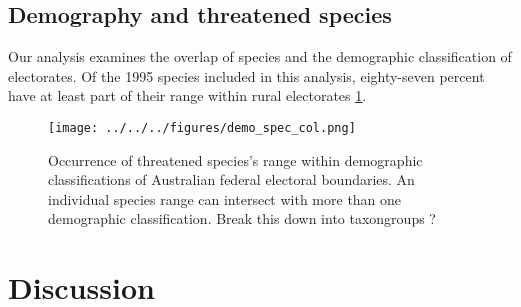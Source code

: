 \documentclass[a4paper,11pt]{article}
\begin{document}


\subsection{Demography and threatened species}
Our analysis examines the overlap of species and the demographic classification of electorates. Of the 1995 species included in this analysis, eighty-seven percent have at least part of their range within rural electorates \ref{fig:demo}.

\begin{figure}[H]
	\centering
    \texttt{[image: ../../../figures/demo\_spec\_col.png]}
    \caption{Occurrence of threatened species's range within demographic classifications of Australian federal electoral boundaries. An individual species range can intersect with more than one demographic classification. Break this down into taxongroups ?}
    \label{fig:demo}
\end{figure}


\section{Discussion}
\end{document}
